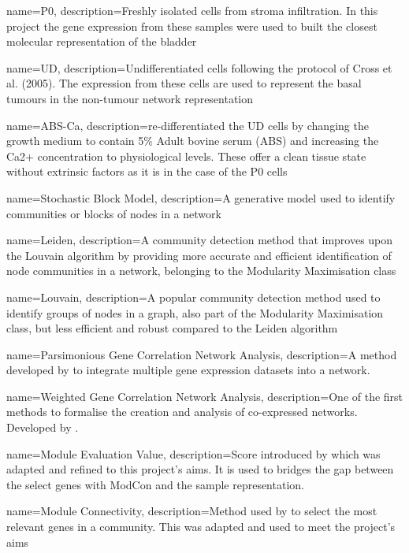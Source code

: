 {
    name=P0,
    description={Freshly isolated cells from stroma infiltration. In this project the gene expression from these samples were used to built the closest molecular representation of the bladder}
}

{
    name=UD,
    description={Undifferentiated cells following the protocol of Cross et al. (2005). The expression from these cells are used to represent the basal tumours in the non-tumour network representation}
}

{
    name=ABS-Ca,
    description={re-differentiated the UD cells by changing the growth medium to contain 5\% Adult bovine serum (ABS) and increasing the Ca2+ concentration to physiological levels. These offer a clean tissue state without extrinsic factors as it is in the case of the P0 cells}
}


{
    name=Stochastic Block Model,
    description={A generative model used to identify communities or blocks of nodes in a network}
}

{
    name=Leiden,
    description={A community detection method that improves upon the Louvain algorithm by providing more accurate and efficient identification of node communities in a network, belonging to the Modularity Maximisation class}
}

{
    name=Louvain,
    description={A popular community detection method used to identify groups of nodes in a graph, also part of the Modularity Maximisation class, but less efficient and robust compared to the Leiden algorithm}
}


{
    name=Parsimonious Gene Correlation Network Analysis,
    description={A method developed by \citet{Care2019-ij} to integrate multiple gene expression datasets into a network.}
}

{
    name=Weighted Gene Correlation Network Analysis,
    description={One of the first methods to formalise the creation and analysis of co-expressed networks. Developed by \citet{Langfelder2008-sn}.}
}


{
    name=Module Evaluation Value,
    description={Score introduced by \citep{Care2019-ij} which was adapted and refined to this project's aims. It is used to bridges the gap between the select genes with ModCon and the sample representation.}
}

{
    name=Module Connectivity,
    description={Method used by \citep{Care2019-ij} to select the most relevant genes in a community. This was adapted and used to meet the project's aims}
}

